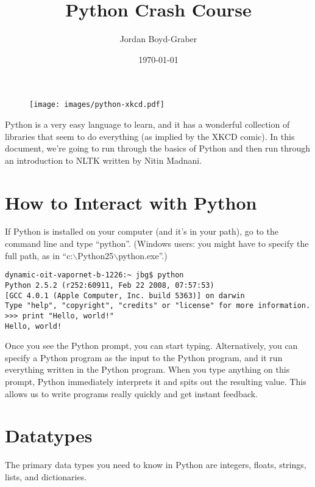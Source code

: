 \documentclass[12pt]{article}
\title{Python Crash Course}
\author{Jordan Boyd-Graber}
\date{\today}
\newenvironment{mylisting}
{\begin{list}{}{\setlength{\leftmargin}{1em}}\item\scriptsize\bfseries}
{\end{list}}
\begin{document}
  \maketitle 

\begin{figure}[t]
\begin{center}
\texttt{[image: images/python-xkcd.pdf]}
\end{center}
\label{fig:xkcd}
\end{figure}

Python is a very easy language to learn, and it has a wonderful collection of libraries that seem to do everything (as implied by the XKCD comic).  In this document, we're going to run through the basics of Python and then run through an introduction to NLTK written by Nitin Madnani.

\section{How to Interact with Python}

If Python is installed on your computer (and it's in your path), go to the command line and type ``python''.  (Windows users: you might have to specify the full path, as in ``c:$\backslash$Python25$\backslash$python.exe''.)

\begin{mylisting}
\begin{verbatim}
dynamic-oit-vapornet-b-1226:~ jbg$ python
Python 2.5.2 (r252:60911, Feb 22 2008, 07:57:53) 
[GCC 4.0.1 (Apple Computer, Inc. build 5363)] on darwin
Type "help", "copyright", "credits" or "license" for more information.
>>> print "Hello, world!"
Hello, world!
\end{verbatim}
\end{mylisting}

Once you see the Python prompt, you can start typing.  Alternatively, you can specify a Python program as the input to the Python program, and it run everything written in the Python program.  When you type anything on this prompt, Python immediately interprets it and spits out the resulting value.  This allows us to write programs really quickly and get instant feedback.

\section{Datatypes}

The primary data types you need to know in Python are integers, floats, strings, lists, and dictionaries.  
\end{document}
